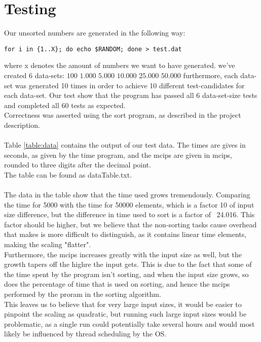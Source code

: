 \section{Testing}

Our unsorted numbers are generated in the following way:
\begin{lstlisting}
for i in {1..X}; do echo $RANDOM; done > test.dat
\end{lstlisting}
\begin{comment}
This line solves a syntax highlighting problem in vim caused by the isolated $ above.
\end{comment}
where x denotes the amount of numbers we want to have generated.
we've created 6 data-sets: $100$ $1.000$ $5.000$ $10.000$ $25.000$ $50.000$
furthermore, each data-set was generated 10 times in order to achieve 10 different test-candidates for each data-set.
Our test show that the program has passed all 6 data-set-size tests and completed all 60 tests as expected.\\
Correctness was asserted using the sort program, as described in the project description.\\
\\
Table \ref{table:data} contains the output of our test data. The times are gives in seconds, as given by the time program, and the mcips are given in mcips, rounded to three digits after the decimal point.\\
The table can be found as dataTable.txt.\\
\\
The data in the table show that the time used grows tremendously. Comparing the time for 5000 with the time for 50000 elements, which is a factor 10 of input size difference, but the difference in time used to sort is a factor of ~24.016. This factor should be higher, but we believe that the non-sorting tasks cause overhead that makes is more difficult to distinguish, as it contains linear time elements, making the scaling "flatter".\\
Furthermore, the mcips increases greatly with the input size as well, but the growth tapers off the highre the input gets. This is due to the fact that some of the time spent by the program isn't sorting, and when the input size grows, so does the percentage of time that is used on sorting, and hence the mcips performed by the proram in the sorting algorithm.\\
This leaves us to believe that for very large input sizes, it would be easier to pinpoint the scaling as quadratic, but running such large input sizes would be problematic, as a single run could potentially take several hours and would most likely be influenced by thread scheduling by the OS.

